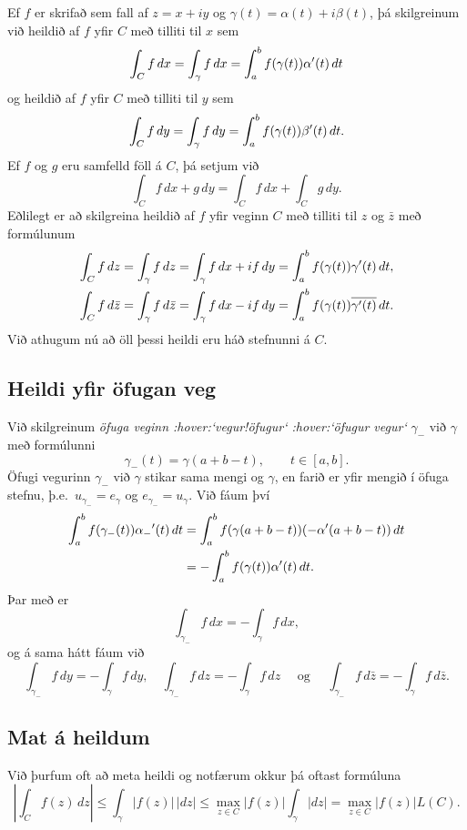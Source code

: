Ef $f$ er skrifað sem fall af $z=x+iy$ og
$\gamma(t)=\alpha(t)+i\beta(t)$, þá skilgreinum við heildið af  $f$
yfir $C$ með tilliti til $x$ sem 
 $$\int_C f \, dx =\int_\gamma f\, dx = \int_a\sp b f(\gamma(t))
\alpha{\sp{\prime}}(t) \, dt
 $$
og heildið af $f$ yfir $C$  með tilliti til $y$ sem
 $$\int_C f \, dy =\int_\gamma f\, dy = \int_a\sp b f(\gamma(t))
\beta{\sp{\prime}}(t) \, dt.
 $$
Ef $f$ og $g$ eru samfelld föll á $C$, þá setjum við 
 $$\int_C f\, dx +g \, dy = \int_C f\, dx + \int_C g\, dy.
 $$
Eðlilegt er að skilgreina heildið af $f$ yfir veginn
$C$ með tilliti til $z$ og $\bar z$ með formúlunum
\begin{gather*}
\int_C f\, dz =\int_\gamma f\, dz= \int_\gamma f\, dx +if\, dy =
\int_a^bf(\gamma(t))\gamma{\sp{\prime}}(t) \, dt,\\
\int_C f\, d\bar z =\int_\gamma f\, d\bar z= \int_\gamma
f\, dx -if\, dy = 
\int_a^bf(\gamma(t))\overline{\gamma{\sp{\prime}}(t)} \, dt.
\end{gather*}
Við athugum nú að öll þessi heildi eru háð stefnunni á $C$.  


\subsection*{Heildi yfir öfugan veg}

Við
skilgreinum {\it öfuga veginn :hover:`vegur!öfugur` :hover:`öfugur vegur`}
$\gamma_-$ við $\gamma$ með formúlunni 
 $$\gamma_-(t)=\gamma(a+b-t), \qquad t\in [a,b].
 $$
Öfugi vegurinn ${\gamma}_-$ við ${\gamma}$ stikar sama mengi og
${\gamma}$, en farið er yfir mengið í öfuga stefnu,
þ.e.~$u_{\gamma_-}=e_{\gamma}$ og $e_{\gamma_-}=u_{\gamma}$.
Við fáum því     
\begin{align*}
\int_a\sp b f(\gamma_-(t))\alpha_-{\sp{\prime}}(t) \, dt &=
\int_a\sp b f(\gamma(a+b-t))(-\alpha{\sp{\prime}}(a+b-t)) \, dt \\
&=
-\int_a\sp b f(\gamma(t))\alpha{\sp{\prime}}(t) \, dt.
\end{align*}
Þar með er
 $$\int_{\gamma_-}f\, dx = -\int_\gamma f\, dx,
 $$
og á sama hátt fáum við 
 $$
\int_{\gamma_-}f\, dy = -\int_\gamma f\, dy, \quad 
\int_{\gamma_-}f\, dz = -\int_\gamma f\, dz \quad \text{ og } \quad
\int_{\gamma_-}f\, d\bar z = -\int_\gamma f\, d\bar z.
 $$


\subsection*{Mat á heildum}

Við þurfum oft  að meta heildi og notfærum okkur þá
oftast formúluna
 $$
| \int_C f(z)\, dz| \leq \int_\gamma |f(z)|\, |dz|\leq \max_{z\in C}
|f(z)| \int_\gamma |dz|= \max_{z\in C}|f(z)|L(C).
 $$



